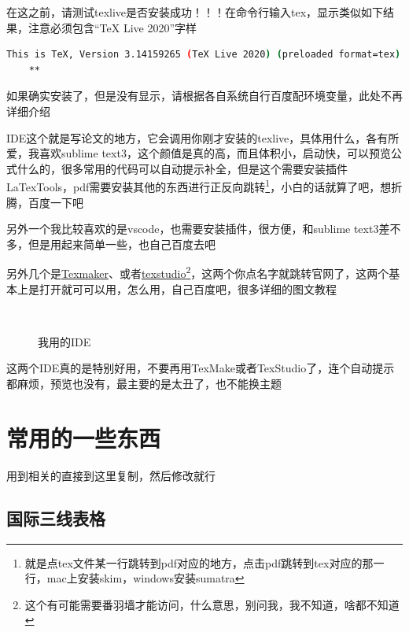 \documentclass[AutoFakeBold]{LZUThesis2007}
\begin{document}
在这之前，请测试texlive是否安装成功！！！在命令行输入tex，显示类似如下结果，注意必须包含“TeX Live 2020”字样

\begin{lstlisting}[language=bash]
    This is TeX, Version 3.14159265 (TeX Live 2020) (preloaded format=tex)
    **
\end{lstlisting}


如果确实安装了，但是没有显示，请根据各自系统自行百度配环境变量，此处不再详细介绍


IDE这个就是写论文的地方，它会调用你刚才安装的texlive，具体用什么，各有所爱，我喜欢sublime text3，这个颜值是真的高，而且体积小，启动快，可以预览公式什么的，很多常用的代码可以自动提示补全，但是这个需要安装插件LaTexTools，pdf需要安装其他的东西进行正反向跳转\footnote{就是点tex文件某一行跳转到pdf对应的地方，点击pdf跳转到tex对应的那一行，mac上安装skim，windows安装sumatra}，小白的话就算了吧，想折腾，百度一下吧


另外一个我比较喜欢的是vscode，也需要安装插件，很方便，和sublime text3差不多，但是用起来简单一些，也自己百度去吧

另外几个是\href{https://www.xm1math.net/texmaker}{Texmaker}、或者\href{http://texstudio.sourceforge.net/}{texstudio}\footnote{这个有可能需要番羽墙才能访问，什么意思，别问我，我不知道，啥都不知道}，这两个你点名字就跳转官网了，这两个基本上是打开就可可以用，怎么用，自己百度吧，很多详细的图文教程


\begin{figure}[H]
	\centering
	\qquad
	\\
    \caption{我用的IDE}
    \label{fig_ide}
\end{figure}

这两个IDE真的是特别好用，不要再用TexMake或者TexStudio了，连个自动提示都麻烦，预览也没有，最主要的是太丑了，也不能换主题



\section{常用的一些东西} %
\label{sec:常用的一些东西}

用到相关的直接到这里复制，然后修改就行

\subsection{国际三线表格} %
\label{sub:国际三线表格}
\end{document}
